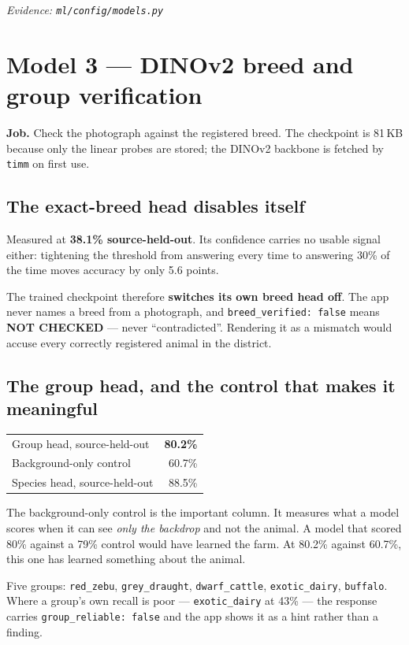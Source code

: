\documentclass[11pt,a4paper]{article}
\newcommand{\evidence}[1]{{\small\color{soft}\textit{Evidence: #1}}}
\newcommand{\good}[1]{{\color{measured}\textbf{#1}}}
\newcommand{\bad}[1]{{\color{invented}\textbf{#1}}}
\begin{document}
\evidence{\texttt{ml/config/models.py}}

\section{Model 3 --- DINOv2 breed and group verification}

\textbf{Job.} Check the photograph against the registered breed. The checkpoint
is 81\,KB because only the linear probes are stored; the DINOv2 backbone is
fetched by \texttt{timm} on first use.

\subsection*{The exact-breed head disables itself}

Measured at \bad{38.1\% source-held-out}. Its confidence carries no usable
signal either: tightening the threshold from answering every time to answering
30\% of the time moves accuracy by only 5.6 points.

The trained checkpoint therefore \textbf{switches its own breed head off}. The
app never names a breed from a photograph, and \texttt{breed\_verified: false}
means \textbf{NOT CHECKED} --- never ``contradicted''. Rendering it as a
mismatch would accuse every correctly registered animal in the district.

\subsection*{The group head, and the control that makes it meaningful}

\begin{tabular}{@{}lr@{}}
\toprule
Group head, source-held-out & \good{80.2\%} \\
Background-only control & 60.7\% \\
Species head, source-held-out & 88.5\% \\
\bottomrule
\end{tabular}

The background-only control is the important column. It measures what a model
scores when it can see \emph{only the backdrop} and not the animal. A model
that scored 80\% against a 79\% control would have learned the farm. At
80.2\% against 60.7\%, this one has learned something about the animal.

Five groups: \texttt{red\_zebu}, \texttt{grey\_draught},
\texttt{dwarf\_cattle}, \texttt{exotic\_dairy}, \texttt{buffalo}. Where a
group's own recall is poor --- \texttt{exotic\_dairy} at 43\% --- the response
carries \texttt{group\_reliable: false} and the app shows it as a hint rather
than a finding.
\end{document}
